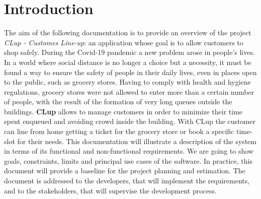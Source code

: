 \documentclass[a4paper, 10pt, oneside]{article}
\newcommand{\yasmin}[1]{\textcolor{Red}{#1}}
\begin{document}
\section{Introduction}
\label{introduction}
The aim of the following documentation is to provide an overview of the project \textit{CLup - Customes Line-up}: an application whose goal is to allow customers to shop safely. During the Covid-19 pandemic a new problem arose in people's lives. In a world where social distance is no longer a choice but a necessity, it must be found a way to ensure the safety of people in their daily lives, even in places open to the public, such as grocery stores. Having to comply with health and hygiene regulations, grocery stores were not allowed to enter more than a certain number of people, with the result of the formation of very long queues outside the buildings. \textbf{CLup} allows to manage customers in order to minimize their time spent enqueued and avoiding crowd inside the building. With CLup the customer can line from home getting a ticket for the grocery store or book a specific time-slot for their needs. This documentation will illustrate a description of the system in terms of its functional and non-functional requirements. We are going to show goals, constraints, limits and principal use cases of the software. In practice, this document will provide a baseline for the project planning and estimation. The document is addressed to the developers, that will implement the requirements, and to the stakeholders, that will supervise the development process.
\end{document}
